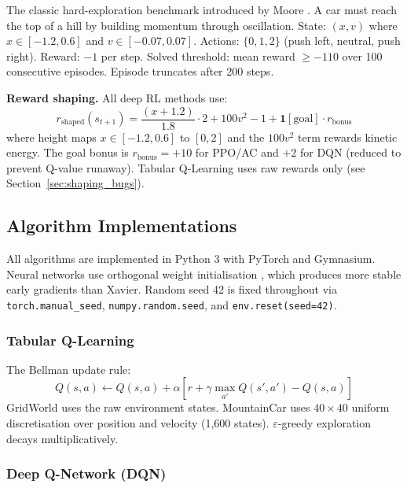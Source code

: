 \documentclass[a4paper,12pt]{article}
\begin{document}
The classic hard-exploration benchmark introduced by Moore \cite{moore1990efficient}. A car must reach the top of a hill by building momentum through oscillation. State: $(x, v)$ where $x \in [-1.2, 0.6]$ and $v \in [-0.07, 0.07]$. Actions: $\{0,1,2\}$ (push left, neutral, push right). Reward: $-1$ per step. Solved threshold: mean reward $\geq -110$ over 100 consecutive episodes. Episode truncates after 200 steps.

\textbf{Reward shaping.} All deep RL methods use:
\begin{equation}
  r_{\text{shaped}}(s_{t+1}) = \frac{(x+1.2)}{1.8} \cdot 2 + 100v^2 - 1 + \mathbf{1}[\text{goal}] \cdot r_{\text{bonus}}
\end{equation}
where height maps $x \in [-1.2, 0.6]$ to $[0,2]$ and the $100v^2$ term rewards kinetic energy. The goal bonus is $r_{\text{bonus}} = +10$ for PPO/AC and $+2$ for DQN (reduced to prevent Q-value runaway). Tabular Q-Learning uses raw rewards only (see Section~\ref{sec:shaping_bugs}).

\subsection{Algorithm Implementations}

All algorithms are implemented in Python 3 with PyTorch and Gymnasium. Neural networks use orthogonal weight initialisation \cite{saxe2013exact}, which produces more stable early gradients than Xavier. Random seed 42 is fixed throughout via \texttt{torch.manual\_seed}, \texttt{numpy.random.seed}, and \texttt{env.reset(seed=42)}.

\subsubsection{Tabular Q-Learning}

The Bellman update rule:
\begin{equation}
  Q(s,a) \leftarrow Q(s,a) + \alpha \left[r + \gamma \max_{a'} Q(s',a') - Q(s,a)\right]
\end{equation}
GridWorld uses the raw environment states. MountainCar uses $40\times40$ uniform discretisation over position and velocity (1,600 states). $\varepsilon$-greedy exploration decays multiplicatively.

\subsubsection{Deep Q-Network (DQN)}
\end{document}
